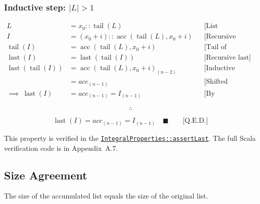 \subsubsection*{Inductive step: $\lvert L\rvert > 1$}

\begin{equation*}
\begin{aligned}
L &= x_0 :: \operatorname{tail}(L)
  && \text{[List decomposition]} \\
I &= (x_0 + i) :: \operatorname{acc}(\operatorname{tail}(L), x_0 + i)
  && \text{[Recursive definition]} \\
\operatorname{tail}(I) &= \operatorname{acc}(\operatorname{tail}(L), x_0 + i)
  && \text{[Tail of integral]} \\
\operatorname{last}(I) &= \operatorname{last}(\operatorname{tail}(I))
  && \text{[Recursive last]} \\
\operatorname{last}(\operatorname{tail}(I)) &= \operatorname{acc}(\operatorname{tail}(L), x_0 + i)_{(n - 2)}
  && \text{[Inductive hypothesis]} \\
&= acc_{(n - 1)}
  && \text{[Shifted indexing]} \\
\implies \ \operatorname{last}(I) &= acc_{(n - 1)} = I_{(n - 1)}
  && \text{[By substitution]}
\end{aligned}
\end{equation*}

\begin{equation*}
\therefore
\end{equation*}

\begin{equation*}
\operatorname{last}(I) = acc_{(n - 1)} = I_{(n - 1)} \quad \blacksquare
  \qquad \text{[Q.E.D.]}
\end{equation*}

{\raggedright
This property is verified in the
\href{https://github.com/thiagomata/prime-numbers/blob/master/src/main/scala/v1/chapter3/list/integral/properties/IntegralProperties.scala}{\texttt{IntegralProperties::\allowbreak assertLast}}.
The full Scala verification code is in Appendix~A.7.
\par}

\subsection{Size Agreement}
\label{sec:size-agreement}

The size of the accumulated list equals the size of the original list.

